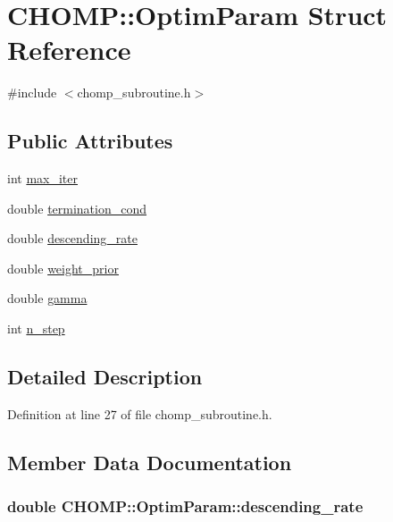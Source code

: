 \hypertarget{struct_c_h_o_m_p_1_1_optim_param}{}\section{C\+H\+O\+MP\+:\+:Optim\+Param Struct Reference}
\label{struct_c_h_o_m_p_1_1_optim_param}


{\ttfamily \#include $<$chomp\+\_\+subroutine.\+h$>$}

\subsection*{Public Attributes}
\begin{DoxyCompactItemize}
\item 
int \hyperlink{struct_c_h_o_m_p_1_1_optim_param_a0ede8f165be67dd3607e47fa90ed9c31}{max\+\_\+iter}
\item 
double \hyperlink{struct_c_h_o_m_p_1_1_optim_param_afb3b23647f1698f1815f4f877ac302ea}{termination\+\_\+cond}
\item 
double \hyperlink{struct_c_h_o_m_p_1_1_optim_param_a24f769bd28ca6ecceadb0b88a6e5c8fa}{descending\+\_\+rate}
\item 
double \hyperlink{struct_c_h_o_m_p_1_1_optim_param_a7dc4e45cd704217867a399e656af6b87}{weight\+\_\+prior}
\item 
double \hyperlink{struct_c_h_o_m_p_1_1_optim_param_a08dbedf3d695dd849e99972eeda4854a}{gamma}
\item 
int \hyperlink{struct_c_h_o_m_p_1_1_optim_param_ac6dafdf330d8f879009f461a77b41c63}{n\+\_\+step}
\end{DoxyCompactItemize}


\subsection{Detailed Description}


Definition at line 27 of file chomp\+\_\+subroutine.\+h.



\subsection{Member Data Documentation}
\subsubsection[{\texorpdfstring{descending\+\_\+rate}{descending_rate}}]{\setlength{\rightskip}{0pt plus 5cm}double C\+H\+O\+M\+P\+::\+Optim\+Param\+::descending\+\_\+rate}\hypertarget{struct_c_h_o_m_p_1_1_optim_param_a24f769bd28ca6ecceadb0b88a6e5c8fa}{}\label{struct_c_h_o_m_p_1_1_optim_param_a24f769bd28ca6ecceadb0b88a6e5c8fa}


